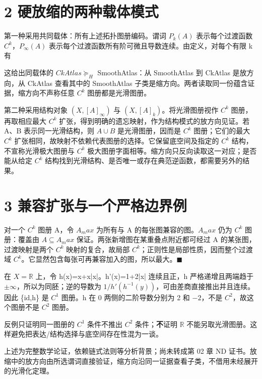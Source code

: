 \documentclass[UTF8,a4paper,zihao=-4,fontset=windows,openany]{ctexbook}
\newcommand{\mcsdisplay}[1]{%
  \par\addvspace{0.7em}%
  \sbox{\mcsmathbox}{\ensuremath{\displaystyle #1}}%
  \ifdim\wd\mcsmathbox>\linewidth
    \noindent\resizebox{\linewidth}{!}{\usebox{\mcsmathbox}}%
  \else
    \noindent\hspace*{\fill}\usebox{\mcsmathbox}\hspace*{\fill}%
  \fi
  \par\addvspace{0.7em}%
}
\def\ensuremath#1{#1}%
\def\mathrm#1{#1}%
\begin{document}
\section{2 硬放缩的两种载体模式}
第一种采用共同载体：所有上述拓扑图册编码。谓词 \(P_k(A)\) 表示每个过渡函数 \(C^k\)，\(P_\infty(A)\) 表示每个过渡函数所有阶可微且导数连续。由定义，对每个有限 k 有


\mcsdisplay{P_\infty(A)\Rightarrow P_k(A).}
\noindent 这给出同载体的 \(\mathrm{CkAtlas}\succeq_H\) SmoothAtlas：从 SmoothAtlas 到 CkAtlas 是放方向，从 CkAtlas 查看其中的 SmoothAtlas 子类是缩方向。两者读取同一份蕴含证据，缩方向不声称任意 \(C^k\) 图册都是光滑图册。

第二种采用结构对象 \((X,[A]_\infty)\) 与 \((X,[A]_k)\)。将光滑图册视作 \(C^k\) 图册，再取相应最大 \(C^k\) 扩张，得到明确的遗忘映射，作为结构模式的放方向见证。若 A、B 表示同一光滑结构，则 \(A\cup B\) 是光滑图册，因而是 \(C^k\) 图册；它们的最大 \(C^k\) 扩张相同，故映射不依赖代表图册的选择。它保留底空间及指定的 \(C^k\) 结构，不宣称光滑极大图册与 \(C^k\) 极大图册字面相等。缩方向只反向读取这一对应；是否能从给定 \(C^k\) 结构找到光滑结构、是否唯一或存在典范逆函数，都需要另外的结果。

\section{3 兼容扩张与一个严格边界例}
对一个 \(C^k\) 图册 A，令 \(A_\mathrm{max}\) 为所有与 A 的每张图兼容的图。\(A_\mathrm{max}\) 仍为 \(C^k\) 图册：覆盖由 \(A\subseteq A_\mathrm{max}\) 保证。两张新增图在某重叠点附近都可经过 A 的某张图，过渡映射是两个 \(C^k\) 映射的复合，故局部 \(C^k\)；正则性是局部性质，因而整个过渡域 \(C^k\)。它显然包含每张可再兼容加入的图，所以最大。\(\blacksquare\)

在 \(X=\mathbb{R}\) 上，令 h(x)=x+x|x|。h'(x)=1+2|x| 连续且正，h 严格递增且两端趋于 \(\pm\infty\)，所以为同胚；逆的导数为 \(1/h'(h^{-1}(y))\)，可由差商直接推出并且连续。因此 \{id,h\} 是 \(C^{1}\) 图册。h 在 0 两侧的二阶导数分别为 2 和 \(-2\)，不是 \(C^{2}\)，故这个图册不是 \(C^{2}\) 图册。

反例只证明同一图册的 \(C^{1}\) 条件不推出 \(C^{2}\) 条件；\textbf{不}证明 \(\mathbb{R}\) 不能另取光滑图册。这样避免把表达/结构选择与底空间存在性混为一谈。

上述为完整数学论证，依赖链式法则等分析背景；尚未转成第 02 章 ND 证书。放缩中的放方向由所选谓词直接验证，缩方向沿同一证据查看子类，不借用未经展开的光滑化定理。
\end{document}
